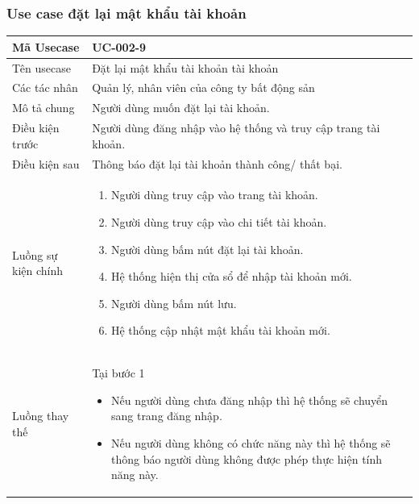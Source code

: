 \documentclass[12pt,a4paper]{article}
\begin{document}
    \subsubsection*{Use case đặt lại mật khẩu tài khoản}
    \begin{table}[H]
        \centering
        \begin{tabular}{|p{3.5cm}|p{11.5cm}|c|}
            \hline
            Mã Usecase      & UC-002-9                                                       \\
            \hline
            Tên usecase     & Đặt lại mật khẩu tài khoản tài khoản                           \\
            \hline
            Các tác nhân    & Quản lý, nhân viên của công ty bất động sản                    \\
            \hline
            Mô tả chung     & Người dùng muốn đặt lại tài khoản.                             \\
            \hline
            Điều kiện trước & Người dùng đăng nhập vào hệ thống và truy cập trang tài khoản. \\
            \hline
            Điều kiện sau   & Thông báo đặt lại tài khoản thành công/ thất bại.              \\
            \hline
            Luồng sự kiện chính & \vspace{-.8cm}\begin{enumerate}
                                                    \item Người dùng truy cập vào trang tài khoản.
                                                    \item Người dùng truy cập vào chi tiết tài khoản.
                                                    \item  Người dùng bấm nút đặt lại tài khoản.
                                                    \item  Hệ thống hiện thị cửa sổ để nhập tài khoản mới.
                                                    \item  Người dùng bấm nút lưu.
                                                    \item Hệ thống cập nhật mật khẩu tài khoản mới.
            \end{enumerate}
            \\
            \hline
            Luồng thay thế & Tại bước 1\newline
            \vspace{-.8cm}\begin{itemize}
                              \item Nếu người dùng chưa đăng nhập thì hệ thống sẽ chuyển sang trang đăng nhập.
                              \item Nếu người dùng không có chức năng này thì hệ thống sẽ thông báo người dùng không được phép thực hiện tính năng này.
            \end{itemize}


\end{tabular}
\end{table}
\end{document}

